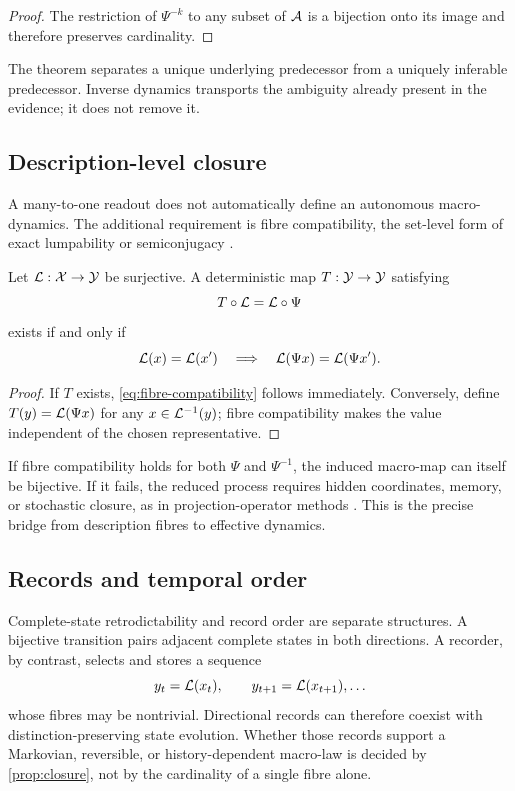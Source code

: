 \begin{proof}
The restriction of \(\Psi^{-k}\) to any subset of \(\mathcal A\) is a bijection onto its image and therefore preserves cardinality.
\end{proof}

The theorem separates a unique underlying predecessor from a uniquely inferable predecessor. Inverse dynamics transports the ambiguity already present in the evidence; it does not remove it.

\subsection{Description-level closure}

A many-to-one readout does not automatically define an autonomous macro-dynamics. The additional requirement is fibre compatibility, the set-level form of exact lumpability or semiconjugacy \citep{lind1995,horstmeyer2016}.

\begin{proposition}
\label{prop:closure}
Let \(\mathcal L:\mathcal X\to\mathcal Y\) be surjective. A deterministic map \(T:\mathcal Y\to\mathcal Y\) satisfying
\begin{equation}
T\circ\mathcal L=\mathcal L\circ\Psi
\label{eq:closure}
\end{equation}
exists if and only if
\begin{equation}
\mathcal L(x)=\mathcal L(x')
\quad\Longrightarrow\quad
\mathcal L(\Psi x)=\mathcal L(\Psi x').
\label{eq:fibre-compatibility}
\end{equation}
\end{proposition}

\begin{proof}
If \(T\) exists, \cref{eq:fibre-compatibility} follows immediately. Conversely, define \(T(y)=\mathcal L(\Psi x)\) for any \(x\in\mathcal L^{-1}(y)\); fibre compatibility makes the value independent of the chosen representative.
\end{proof}

If fibre compatibility holds for both \(\Psi\) and \(\Psi^{-1}\), the induced macro-map can itself be bijective. If it fails, the reduced process requires hidden coordinates, memory, or stochastic closure, as in projection-operator methods \citep{zwanzig1961,mori1965,chorin2000}. This is the precise bridge from description fibres to effective dynamics.

\subsection{Records and temporal order}

Complete-state retrodictability and record order are separate structures. A bijective transition pairs adjacent complete states in both directions. A recorder, by contrast, selects and stores a sequence
\[
y_t=\mathcal L(x_t),\qquad
y_{t+1}=\mathcal L(x_{t+1}),\ldots
\]
whose fibres may be nontrivial. Directional records can therefore coexist with distinction-preserving state evolution. Whether those records support a Markovian, reversible, or history-dependent macro-law is decided by \cref{prop:closure}, not by the cardinality of a single fibre alone.

